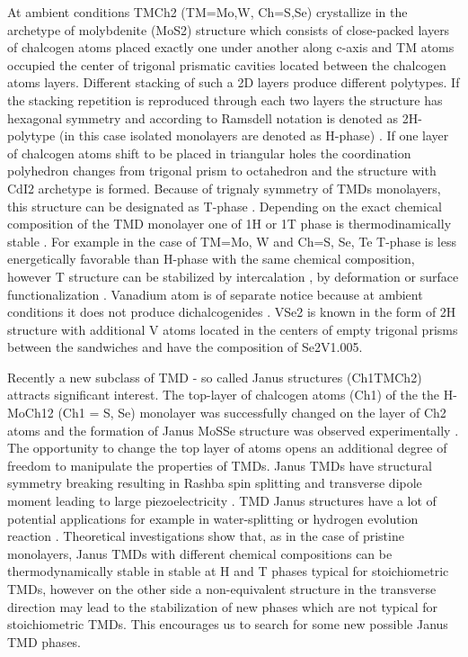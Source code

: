 \documentclass[a4paperm]{article}
\begin{document}
At ambient conditions TMCh2 (TM=Mo,W, Ch=S,Se) crystallize in the archetype of molybdenite (MoS2) structure which consists of close-packed layers of chalcogen atoms placed exactly one under another along c-axis and TM atoms occupied the center of trigonal prismatic cavities located between the chalcogen atoms layers. Different stacking of such a 2D layers produce different polytypes. If the stacking repetition is reproduced through each two layers the structure has hexagonal symmetry and according to Ramsdell notation is denoted as 2H-polytype (in this case isolated monolayers are denoted as H-phase) \cite{huang2020recent}. If one layer of chalcogen atoms shift to be placed in triangular holes the coordination polyhedron changes from trigonal prism to octahedron and the structure with CdI2 archetype is formed. Because of trignaly symmetry of TMDs monolayers, this structure can be designated as T-phase \cite{huang2020recent}. Depending on the exact chemical composition of the TMD monolayer one of 1H or 1T phase is thermodinamically stable \cite{manzeli20172d, ataca2012stable}. For example in the case of TM=Mo, W and Ch=S, Se, Te T-phase is less energetically favorable than H-phase with the same chemical composition, however T structure can be stabilized by intercalation \cite{kan2014structures, wang2014atomic}, by deformation \cite{duerloo2014structural} or surface functionalization \cite{tang2015stabilization, voiry2015covalent}. Vanadium atom is of separate notice because at ambient conditions it does not produce dichalcogenides \cite{murphy1977preparation, le1979elaboration}. VSe2 is known in the form of 2H structure with additional V atoms located in the centers of empty trigonal prisms between the sandwiches and have the composition of Se2V1.005.


Recently a new subclass of TMD - so called Janus structures (Ch1TMCh2) attracts significant interest. The top-layer of chalcogen atoms (Ch1) of the the H-MoCh12 (Ch1 = S, Se) monolayer was successfully changed on the layer of Ch2 atoms and the formation of Janus MoSSe structure was observed experimentally \cite{lu2017, zhang2017janus}. The opportunity to change the top layer of atoms opens an additional degree of freedom to manipulate the properties of TMDs. Janus TMDs have structural symmetry breaking \cite{li2017electronic, van2020first}  resulting in Rashba spin splitting \cite{hu2018intrinsic} and transverse dipole moment leading to large piezoelectricity \cite{dong2017large, li2018recent}. TMD Janus structures have a lot of potential applications for example in water-splitting \cite{xia2018universality, ma2018janus} or hydrogen evolution reaction \cite{er2018prediction, zhou2019janus}. Theoretical investigations show that, as in the case of pristine monolayers, Janus TMDs with different chemical compositions can be thermodynamically stable in stable at H and T phases typical for stoichiometric TMDs, however on the other side a non-equivalent structure in the transverse direction may lead to the stabilization of new phases which are not typical for stoichiometric TMDs. This encourages us to search for some new possible Janus TMD phases.
\end{document}

